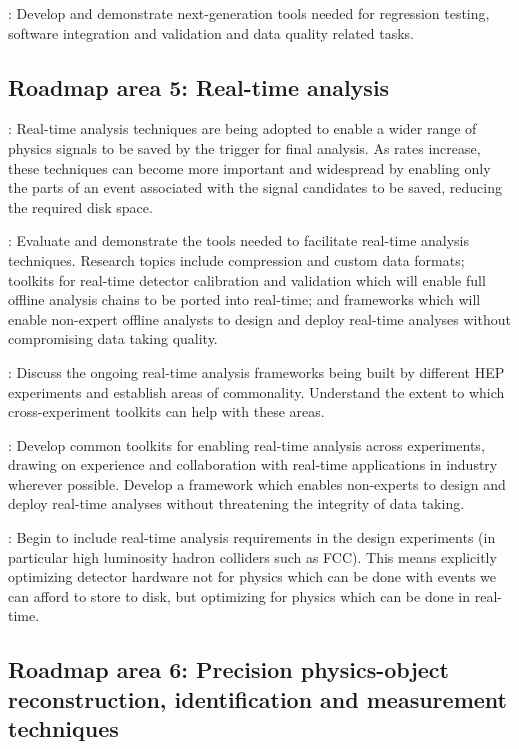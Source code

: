 \vskip 0.5cm
: Develop and demonstrate next-generation tools needed for regression testing, software integration and validation and data quality related tasks. 

\subsection{Roadmap area 5: Real-time analysis}

: Real-time analysis techniques are being adopted to enable a wider range of physics signals to be saved by the trigger for final analysis. As rates increase, these 
techniques can become more important and widespread by enabling only the parts of an event associated with the signal candidates to be saved, reducing the required disk space.

\vskip 0.5cm
 : Evaluate and demonstrate the tools needed to facilitate real-time analysis techniques. Research topics include compression and custom data formats; toolkits for real-time 
detector calibration and validation which will enable full offline analysis chains to be ported into real-time; and frameworks which will enable non-expert offline analysts to design and deploy 
real-time analyses without compromising data taking quality. 

\vskip 0.5cm
: Discuss the ongoing real-time analysis frameworks being built by different HEP experiments and establish areas of commonality. Understand the extent to which 
cross-experiment toolkits can help with these areas. 

\vskip 0.5cm
: Develop common toolkits for enabling real-time analysis across experiments, drawing on experience and collaboration with real-time applications in industry 
wherever possible. Develop a framework which enables non-experts to design and deploy real-time analyses without threatening the integrity of data taking.

\vskip 0.5cm
: Begin to include real-time analysis requirements in the design experiments (in particular high luminosity hadron colliders such as FCC). This means explicitly 
optimizing detector hardware not for physics which can be done with events we can afford to store to disk, but optimizing for physics which can be done in real-time.

\subsection{Roadmap area 6: Precision physics-object reconstruction, identification and measurement techniques}

